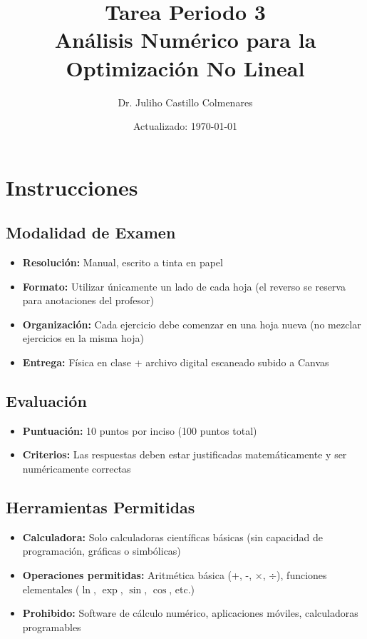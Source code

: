 \documentclass[12pt,a4paper]{article}
\title{\textbf{Tarea Periodo 3 \\ Análisis Numérico para la Optimización No Lineal}}
\author{Dr. Juliho Castillo Colmenares}
\date{Actualizado: \today}
\begin{document}
\maketitle

\section*{Instrucciones}

\subsection*{Modalidad de Examen}
\begin{itemize}
\item \textbf{Resolución:} Manual, escrito a tinta en papel
\item \textbf{Formato:} Utilizar únicamente un lado de cada hoja (el reverso se reserva para anotaciones del profesor)
\item \textbf{Organización:} Cada ejercicio debe comenzar en una hoja nueva (no mezclar ejercicios en la misma hoja)
\item \textbf{Entrega:} Física en clase + archivo digital escaneado subido a Canvas
\end{itemize}

\subsection*{Evaluación}
\begin{itemize}
\item \textbf{Puntuación:} 10 puntos por inciso (100 puntos total)
\item \textbf{Criterios:} Las respuestas deben estar justificadas matemáticamente y ser numéricamente correctas
\end{itemize}

\subsection*{Herramientas Permitidas}
\begin{itemize}
\item \textbf{Calculadora:} Solo calculadoras científicas básicas (sin capacidad de programación, gráficas o simbólicas)
\item \textbf{Operaciones permitidas:} Aritmética básica (+, -, \(\times\), \(\div\)), funciones elementales (\(\ln\), \(\exp\), \(\sin\), \(\cos\), etc.)
\item \textbf{Prohibido:} Software de cálculo numérico, aplicaciones móviles, calculadoras programables
\end{itemize}
\end{document}
